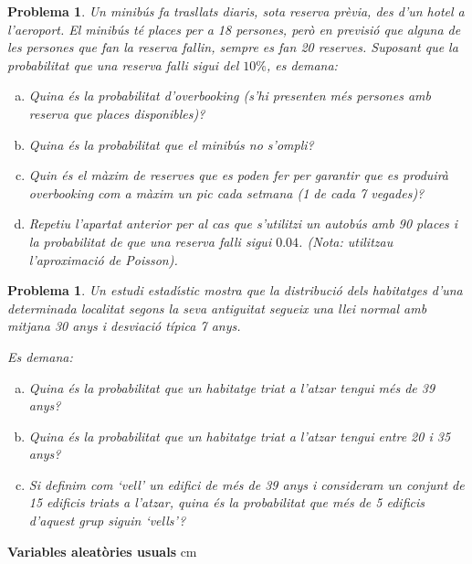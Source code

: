 \documentclass[a4paper,10pt]{article}
\newcounter{prbcont}
\newtheorem{problema}[prbcont]{Problema}
\begin{document}
\begin{problema}
Un minibús fa trasllats diaris, sota reserva prèvia, des d'un hotel a l'aeroport.
El minibús té places per a 18 persones, però en previsió que alguna de les persones que 
fan la reserva fallin, sempre es fan 20 reserves. Suposant que la probabilitat que una reserva
falli sigui del $10\%$, es demana:
\begin{enumerate}[a)]
\item Quina és la probabilitat d'\textit{overbooking} (s'hi presenten més persones amb reserva que
places disponibles)?
\item Quina és la probabilitat que el minibús no s'ompli?
\item Quin és el màxim de reserves que es poden fer per garantir que es produirà \textit{overbooking}
com a màxim un pic cada setmana (1 de cada 7 vegades)? 
\item Repetiu  l'apartat anterior per al cas que s'utilitzi un autobús amb 90 places i la probabilitat 
de que una reserva falli sigui $0.04$. (Nota: utilitzau l'aproximació de Poisson).
\end{enumerate}
\end{problema}

\vspace{0.2cm}

\begin{problema}
Un estudi estad\'\i stic mostra que la distribuci\'o dels habitatges d'una determinada localitat segons la seva antiguitat 
segueix una llei normal amb mitjana 30 anys i desviació típica 7 anys. 

Es demana:
\begin{enumerate}[a)]
\item Quina \'es la probabilitat que un habitatge triat a l'atzar tengui més de 39 anys?
\item Quina és la probabilitat que un habitatge triat a l'atzar tengui entre 20 i 35 anys?
\item Si definim com `vell' un edifici de més de 39 anys i consideram un conjunt de 15 edificis triats a l'atzar,
quina és la probabilitat que més de 5 edificis d'aquest grup siguin `vells'?
\end{enumerate}

\end{problema}




\textbf{Variables aleatòries usuals}
 cm
\end{document}
